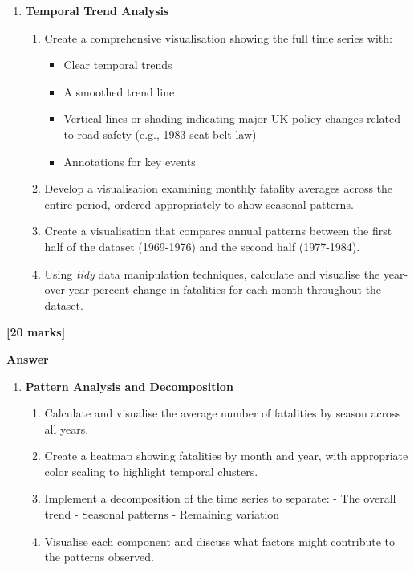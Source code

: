 \documentclass[
  10t,
]{article}
\providecommand{\tightlist}{%
  \setlength{\itemsep}{0pt}\setlength{\parskip}{0pt}}\usepackage{longtable,booktabs,array}
\begin{document}
\begin{enumerate}
\def\labelenumi{\alph{enumi}.}
\setcounter{enumi}{1}
\tightlist
\item
  \textbf{Temporal Trend Analysis}

  \begin{enumerate}
  \def\labelenumii{\roman{enumii}.}
  \tightlist
  \item
    Create a comprehensive visualisation showing the full time series
    with:

    \begin{itemize}
    \tightlist
    \item
      Clear temporal trends
    \item
      A smoothed trend line
    \item
      Vertical lines or shading indicating major UK policy changes
      related to road safety (e.g., 1983 seat belt law)
    \item
      Annotations for key events
    \end{itemize}
  \item
    Develop a visualisation examining monthly fatality averages across
    the entire period, ordered appropriately to show seasonal patterns.
  \item
    Create a visualisation that compares annual patterns between the
    first half of the dataset (1969-1976) and the second half
    (1977-1984).
  \item
    Using \emph{tidy} data manipulation techniques, calculate and
    visualise the year-over-year percent change in fatalities for each
    month throughout the dataset.
  \end{enumerate}
\end{enumerate}

\textbf{{[}20 marks{]}}

\textbf{Answer}

\begin{enumerate}
\def\labelenumi{\alph{enumi}.}
\setcounter{enumi}{2}
\tightlist
\item
  \textbf{Pattern Analysis and Decomposition}

  \begin{enumerate}
  \def\labelenumii{\roman{enumii}.}
  \tightlist
  \item
    Calculate and visualise the average number of fatalities by season
    across all years.
  \item
    Create a heatmap showing fatalities by month and year, with
    appropriate color scaling to highlight temporal clusters.
  \item
    Implement a decomposition of the time series to separate: - The
    overall trend - Seasonal patterns - Remaining variation
  \item
    Visualise each component and discuss what factors might contribute
    to the patterns observed.
  \end{enumerate}
\end{enumerate}
\end{document}
